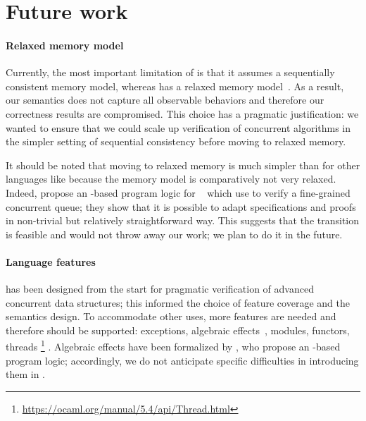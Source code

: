 \section{Future work}

\paragraph{Relaxed memory model}

Currently, the most important limitation of \ZooLang is that it assumes a sequentially consistent memory model, whereas \OCamlFive has a relaxed memory model~\citep{DBLP:conf/pldi/DolanSM18}.
As a result, our semantics does not capture all observable behaviors and therefore our correctness results are compromised.
This choice has a pragmatic justification: we wanted to ensure that we could scale up verification of concurrent algorithms in the simpler setting of sequential consistency before moving to relaxed memory.

It should be noted that moving to relaxed memory is much simpler than for other languages like \C because the \OCamlFive memory model is comparatively not very relaxed.
Indeed, \citet{DBLP:journals/pacmpl/MevelJP20} propose an \Iris-based program logic for \MulticoreOCaml~\citep{DBLP:journals/pacmpl/Sivaramakrishnan20} which \citet{DBLP:journals/pacmpl/MevelJ21} use to verify a fine-grained concurrent queue; they show that it is possible to adapt specifications and proofs in non-trivial but relatively straightforward way.
This suggests that the transition is feasible and would not throw away our work; we plan to do it in the future.

\paragraph{Language features}

\ZooLang has been designed from the start for pragmatic verification of advanced concurrent data structures; this informed the choice of feature coverage and the semantics design.
To accommodate other uses, more features are needed and therefore should be supported: exceptions, algebraic effects~\citep{DBLP:conf/pldi/Sivaramakrishnan21}, modules, functors, threads%
\footnote{
\url{https://ocaml.org/manual/5.4/api/Thread.html}
}%
.
Algebraic effects have been formalized by \citet{DBLP:journals/pacmpl/VilhenaP21}, who propose an \Iris-based program logic; accordingly, we do not anticipate specific difficulties in introducing them in \ZooLang.

